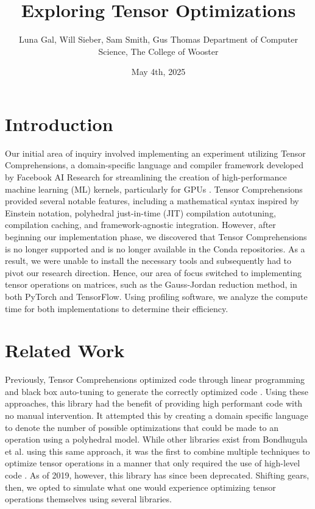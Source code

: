 \documentclass[12pt]{article}
\title{Exploring Tensor Optimizations}
\date{May 4th, 2025}
\author{\parbox{\linewidth}{\centering%
    Luna Gal, Will Sieber, Sam Smith, Gus Thomas
	\endgraf\bigskip
	Department of Computer Science, The College of Wooster
	\bigskip
}}
\begin{document}
\maketitle

\newpage
\tableofcontents
\newpage

\lstlistoflistings
\newpage

\section{Introduction}
Our initial area of inquiry involved implementing an experiment utilizing Tensor Comprehensions, a domain-specific language and compiler framework developed by Facebook AI Research for streamlining the creation of high-performance machine learning (ML) kernels, particularly for GPUs \cite{tens}. Tensor Comprehensions provided several notable features, including a mathematical syntax inspired by Einstein notation, polyhedral just-in-time (JIT) compilation autotuning, compilation caching, and framework-agnostic integration. However, after beginning our implementation phase, we discovered that Tensor Comprehensions is no longer supported and is no longer available in the Conda repositories. As a result, we were unable to install the necessary tools and subsequently had to pivot our research direction. Hence, our area of focus switched to implementing tensor operations on matrices, such as the Gauss-Jordan reduction method, in both PyTorch and TensorFlow. Using profiling software, we analyze the compute time for both implementations to determine their efficiency.

\section{Related Work}
Previously, Tensor Comprehensions optimized code through linear programming and black box auto-tuning to generate the correctly optimized code \cite{neu}. Using these approaches, this library had the benefit of providing high performant code with no manual intervention. It attempted this by creating a domain specific language to denote the number of possible optimizations that could be made to an operation using a polyhedral model. While other libraries exist from Bondhugula et al. using this same approach, it was the first to combine multiple techniques to optimize tensor operations in a manner that only required the use of high-level code \cite{neu, bondhugula2008practical}. As of 2019, however, this library has since been deprecated. Shifting gears, then, we opted to simulate what one would experience optimizing tensor operations themselves using several libraries.
\end{document}
